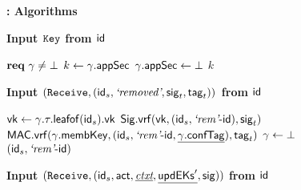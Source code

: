 \begin{figure*}[!p]
\begin{anybox}{\sffamily\bfseries \saik : Algorithms}
\begin{minipage}[t]{0.48\linewidth}
      \end{minipage}
		\hfill
			\begin{minipage}[t]{0.5\linewidth}
        \bf Input {${\normalfont\texttt{Key}}$ from ${\mathsf{id}}$}
				\begin{algorithmic}
					\State $\textbf{req}\ \gamma \neq \bot$
					\State $k \gets \gamma.{\mathsf{appSec}}$
					\State $\gamma.{\mathsf{appSec}} \gets \bot$
					\State \Return $k$
				\end{algorithmic}

        \medskip
        {\bf Input $({\normalfont\texttt{Receive}}, ({\mathsf{id}}_s, {\text{\normalfont \it`removed'}}, {\mathsf{sig}}_t, {\mathsf{tag}}_t))$ from ${\mathsf{id}}$}

        \textnormal{}
        \begin{algorithmic}
          \State ${\mathsf{vk}} \gets \gamma.\tau.{\mathsf{leafof}}({\mathsf{id}}_s).{\mathsf{vk}}$
          \State \KwReq{} ${\mathsf{Sig}}.{\mathsf{vrf}}({\mathsf{vk}}, ({\mathsf{id}}_s, {\text{\normalfont \it`rem'}}\textrm{-}{\ensuremath{\mathsf{id}}}), {\mathsf{sig}}_t)$
          \State \KwReq{} ${\mathsf{MAC}}.{\mathsf{vrf}}(\gamma.{\mathsf{membKey}}, ({\mathsf{id}}_s, {\text{\normalfont \it`rem'}}\textrm{-}{\ensuremath{\mathsf{id}}}, \underline{\gamma.{\mathsf{confTag}}}), {\mathsf{tag}}_t)$
          \State $\gamma \gets \bot$
          \State \Return $({\mathsf{id}}_s, {\text{\normalfont \it`rem'}}\textrm{-}{\ensuremath{\mathsf{id}}})$
        \end{algorithmic}

        \medskip
        \textbf{Input $({\normalfont\texttt{Receive}}, ({\mathsf{id}}_s, \mathsf{act}, \underline{{\normalfont\textit{ctxt}}}, \underline{{\mathsf{updEKs}}'}, {\mathsf{sig}}))$ from ${\mathsf{id}}$}


\end{minipage}
\end{anybox}
\end{figure*}

